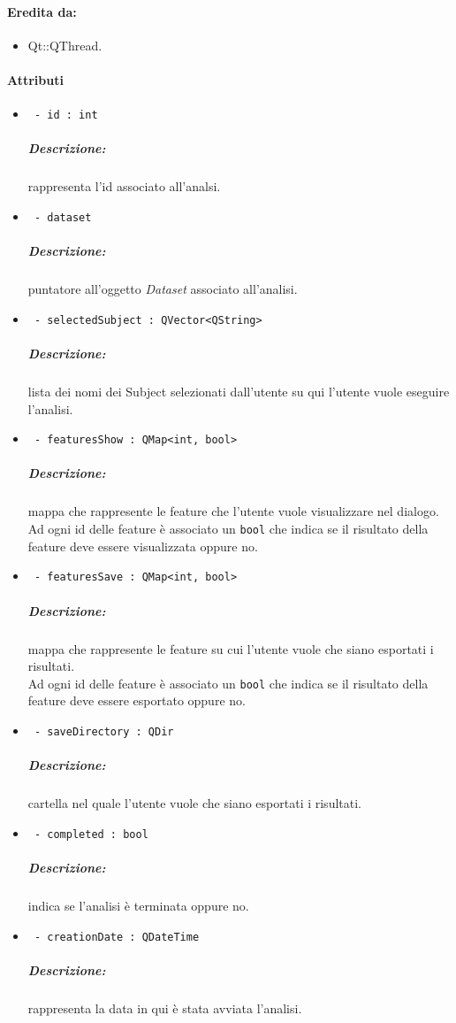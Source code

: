 \paragraph{Eredita da:}
	\begin{itemize}
		\item Qt::QThread.
	\end{itemize}
\paragraph{Attributi \\}
	\begin{itemize}
		\item \color{teal}\verb! - id : int!
		\color{black}
		\subparagraph{Descrizione:} rappresenta l'id associato all'analsi.
		
		\item \color{teal}\verb! - dataset!
		\color{black}
		\subparagraph{Descrizione:} puntatore all'oggetto \textsl{Dataset} associato all'analisi.
		
		\item \color{teal}\verb! - selectedSubject : QVector<QString>!
		\color{black}
		\subparagraph{Descrizione:} lista dei nomi dei Subject\g{} selezionati dall'utente su qui l'utente vuole eseguire l'analisi.
		
		\item \color{teal}\verb! - featuresShow : QMap<int, bool>!
		\color{black}
		\subparagraph{Descrizione:} mappa che rappresente le feature\g{} che l'utente vuole visualizzare nel dialogo.
		\\Ad ogni id delle feature è associato un \verb!bool! che indica se il risultato della feature\g{} deve essere visualizzata oppure no.
		
		\item \color{teal}\verb! - featuresSave : QMap<int, bool>!
		\color{black}
		\subparagraph{Descrizione:} mappa che rappresente le feature\g{} su cui l'utente vuole che siano esportati i risultati.
		\\Ad ogni id delle feature è associato un \verb!bool! che indica se il risultato della feature\g{} deve essere esportato oppure no.
		
		\item \color{teal}\verb! - saveDirectory : QDir!
		\color{black}
		\subparagraph{Descrizione:} cartella nel quale l'utente vuole che siano esportati i risultati.
		
		\item \color{teal}\verb! - completed : bool!
		\color{black}
		\subparagraph{Descrizione:} indica se l'analisi è terminata oppure no.
		
		\item \color{teal}\verb! - creationDate : QDateTime!
		\color{black}
		\subparagraph{Descrizione:} rappresenta la data in qui è stata avviata l'analisi.
			
	\end{itemize}

